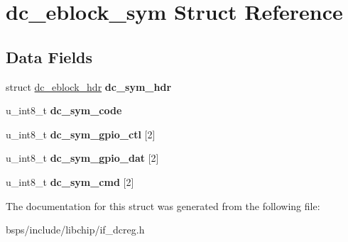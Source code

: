 \hypertarget{structdc__eblock__sym}{}\section{dc\+\_\+eblock\+\_\+sym Struct Reference}
\label{structdc__eblock__sym}
\subsection*{Data Fields}
\begin{DoxyCompactItemize}
\item 
\mbox{\label{structdc__eblock__sym_ae3b6494e161a81c3dda05643b6db0456}} 
struct \mbox{\hyperlink{structdc__eblock__hdr}{dc\+\_\+eblock\+\_\+hdr}} {\bfseries dc\+\_\+sym\+\_\+hdr}
\item 
\mbox{\label{structdc__eblock__sym_a34c13268581f20b43cb90f8e2b16d433}} 
u\+\_\+int8\+\_\+t {\bfseries dc\+\_\+sym\+\_\+code}
\item 
\mbox{\label{structdc__eblock__sym_adb31e36930c53e66fa5308b2e2163fda}} 
u\+\_\+int8\+\_\+t {\bfseries dc\+\_\+sym\+\_\+gpio\+\_\+ctl} \mbox{[}2\mbox{]}
\item 
\mbox{\label{structdc__eblock__sym_ad8242f381496bff557ce4d49e2981ac1}} 
u\+\_\+int8\+\_\+t {\bfseries dc\+\_\+sym\+\_\+gpio\+\_\+dat} \mbox{[}2\mbox{]}
\item 
\mbox{\label{structdc__eblock__sym_a90181a3e595e4af303d6d43816c7d58e}} 
u\+\_\+int8\+\_\+t {\bfseries dc\+\_\+sym\+\_\+cmd} \mbox{[}2\mbox{]}
\end{DoxyCompactItemize}


The documentation for this struct was generated from the following file\+:\begin{DoxyCompactItemize}
\item 
bsps/include/libchip/if\+\_\+dcreg.\+h\end{DoxyCompactItemize}
